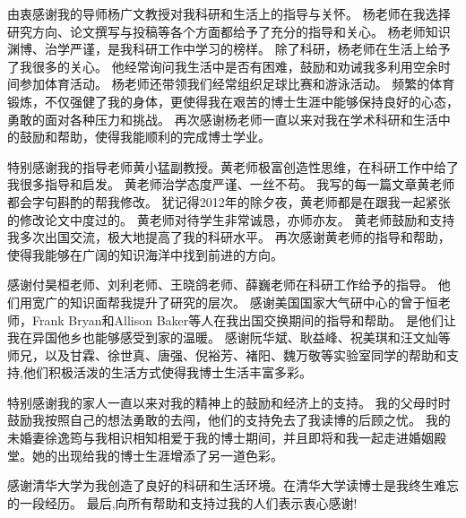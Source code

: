 \begin{acknowledgement}
  由衷感谢我的导师杨广文教授对我科研和生活上的指导与关怀。
  杨老师在我选择研究方向、论文撰写与投稿等各个方面都给予了充分的指导和关心。
  杨老师知识渊博、治学严谨，是我科研工作中学习的榜样。
  除了科研，杨老师在生活上给予了我很多的关心。
  他经常询问我生活中是否有困难，鼓励和劝诫我多利用空余时间参加体育活动。
  杨老师还带领我们经常组织足球比赛和游泳活动。
  频繁的体育锻炼，不仅强健了我的身体，更使得我在艰苦的博士生涯中能够保持良好的心态，勇敢的面对各种压力和挑战。 
  再次感谢杨老师一直以来对我在学术科研和生活中的鼓励和帮助，使得我能顺利的完成博士学业。

  特别感谢我的指导老师黄小猛副教授。黄老师极富创造性思维，在科研工作中给了我很多指导和启发。 
  黄老师治学态度严谨、一丝不苟。
  我写的每一篇文章黄老师都会字句斟酌的帮我修改。
  犹记得2012年的除夕夜，黄老师都是在跟我一起紧张的修改论文中度过的。
  黄老师对待学生非常诚恳，亦师亦友。 
  黄老师鼓励和支持我多次出国交流，极大地提高了我的科研水平。
  再次感谢黄老师的指导和帮助，使得我能够在广阔的知识海洋中找到前进的方向。


  感谢付昊桓老师、刘利老师、王晓鸽老师、薛巍老师在科研工作给予的指导。 
  他们用宽广的知识面帮我提升了研究的层次。
  感谢美国国家大气研中心的曾于恒老师，Frank Bryan和Allison Baker等人在我出国交换期间的指导和帮助。
  是他们让我在异国他乡也能够感受到家的温暖。
  感谢阮华斌、耿益峰、祝美琪和汪文灿等师兄，以及甘霖、徐世真、唐强、倪裕芳、褚阳、魏万敬等实验室同学的帮助和支持,他们积极活泼的生活方式使得我博士生活丰富多彩。 

  
  特别感谢我的家人一直以来对我的精神上的鼓励和经济上的支持。
  我的父母时时鼓励我按照自己的想法勇敢的去闯，他们的支持免去了我读博的后顾之忧。
  我的未婚妻徐逸筠与我相识相知相爱于我的博士期间，并且即将和我一起走进婚姻殿堂。她的出现给我的博士生涯增添了另一道色彩。
  
  感谢清华大学为我创造了良好的科研和生活环境。在清华大学读博士是我终生难忘的一段经历。
  最后,向所有帮助和支持过我的人们表示衷心感谢!

\end{acknowledgement}

